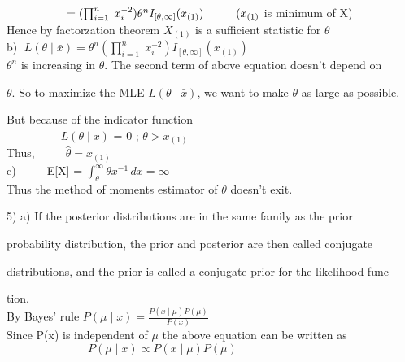 \documentclass[]{article}
\begin{document}
$\hspace{1.85cm}=(\prod_{i=1}^{n} \;x_{i}^{-2})\theta^{n}I_{[\theta,\infty]}(x_{(1)}) \hspace{1cm} ( x_{(1)}$ is minimum of X)\\

Hence by factorzation theorem $X_{(1)}$ is a sufficient statistic for $\theta$\\

b) $\;L(\theta\mid\bar{x}) = \theta^{n}(\prod_{i=1}^{n} \;x_{i}^{-2})I_{[\theta,\infty]}(x_{(1)})$\\

$\theta^{n}$ is increasing in $\theta$. The second term of above equation doesn't depend on

$\theta$. So to maximize the MLE $L(\theta\mid\bar x)$, we want to make $\theta$ as large as possible.

But because of the indicator function\\

$\hspace{2cm}L(\theta\mid\bar x)$ = 0 ; $\theta>x_{(1)}$\\

Thus, $\hspace{1cm}\hat{\theta} = x_{(1)}$\\

c) $\hspace{1cm}$E[X] = $\int_\theta^{\infty}\theta x^{-1}\,dx = \infty $ \\

Thus the method of moments estimator of $ \theta $  doesn't exit.\\

\begin{flushleft}
5) a) If the posterior distributions are in the same family as the prior  
\end{flushleft} 

probability distribution, the prior and posterior are then called conjugate 

distributions, and the prior is called a conjugate prior for the likelihood func-

tion.\\

By Bayes' rule $P(\mu \mid x) = \frac{P(x\mid \mu)P(\mu)}{P(x)}$\\

Since P(x) is independent of $\mu$ the above equation can be written as\\

$\hspace{3cm}P(\mu \mid x) \propto P(x\mid \mu)P(\mu)$\\
\end{document}
